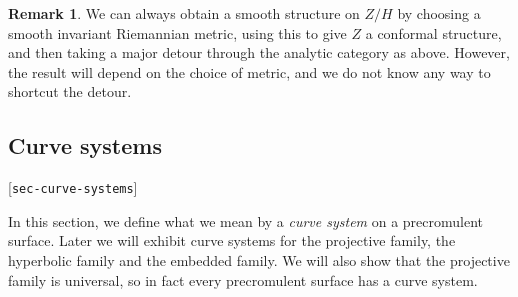 \documentclass[reqno]{amsart}
\newcommand{\lbl}[1]{\label{#1}\textup{[\texttt{#1}]}\par}
\newcommand{\lbl}{\label}
\renewcommand{\:}{\colon}
\theoremstyle{definition}
\newtheorem{remark}[theorem]{Remark}
\begin{document}
\begin{remark}
 We can always obtain a smooth structure on $Z/H$ by choosing a smooth
 invariant Riemannian metric, using this to give $Z$ a conformal
 structure, and then taking a major detour through the analytic
 category as above.  However, the result will depend on the choice of
 metric, and we do not know any way to shortcut the detour.
\end{remark}

\subsection{Curve systems}
\lbl{sec-curve-systems}

In this section, we define what we mean by a \emph{curve system} on a
precromulent surface.  Later we will exhibit curve systems for the
projective family, the hyperbolic family and the embedded family.  We
will also show that the projective family is universal, so in fact
every precromulent surface has a curve system.
\end{document}
